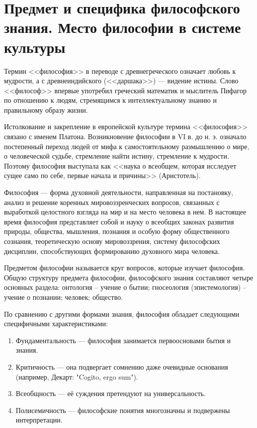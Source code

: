 \documentclass[12pt,a4paper]{article}
\begin{document}
	
	\newpage
	\tableofcontents
	\setcounter{page}{2}
	\newpage
	
	\section{Предмет и специфика философского знания. Место философии в системе культуры~\checkmark}
	\par Термин <<философия>> в переводе с древнегреческого означает любовь к мудрости, а с древ­неиндийского (<<даршака>>) — видение истины. Слово <<философ>> впервые употребил греческий математик и мыс­литель Пифагор по отношению к людям, стре­мящимся к интеллектуальному знанию и правильному образу жизни. 
	\par Истолкование и закрепление в европейской культуре термина <<фи­лософия>> связано с именем Платона. Возникновение философии в VI в. до н. э. означало постепенный переход людей от мифа к самостоятельному размышлению о мире, о челове­ческой судьбе, стремление найти истину, стремление к мудрости. Поэтому философия выступала как <<наука о всеобщем, которая исследует сущее само по себе, первые начала и причины>> (Аристотель). 
	\par  Философия — форма духовной деятельности, направленная на по­становку, анализ и решение коренных мировоззренческих вопросов, связанных с выработкой целостного взгляда на мир и на место чело­века в нем. В настоящее время философия представляет собой и науку о все­общих законах развития природы, общества, мышления, познания и особую форму общественного сознания, теоретическую основу ми­ровоззрения, систему философских дисциплин, способствующих фор­мированию духовного мира человека. 
	\par Предметом философии называется круг вопросов, которые изуча­ет философия. Общую структуру предмета философии, философско­го знания составляют четыре основных раздела: онтология -- учение о бытии; гносеология (эпистемология) -- учение о познании; человек; общество.
	\par По сравнению с другими формами знания, философия обладает следующими специфичными характеристиками:
	\begin{enumerate}
		\item Фундаментальность — философия занимается первоосновами бытия и знания.
		\item Критичность — она подвергает сомнению даже очевидные основания (например, Декарт: "Cogito, ergo sum").
		\item Всеобщность — её суждения претендуют на универсальность.
		\item Полисемичность — философские понятия многозначны и подвержены интерпретации.
	\end{enumerate}
\end{document}
